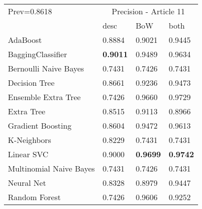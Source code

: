 \begin{tabular}{|l|l|l|l| }
\hline
Prev=0.8618 &  \multicolumn{3}{c|}{Precision - Article 11} \\
\cline{2-4} & desc & BoW & both \\ \hline
AdaBoost                & 0.8884 & 0.9021 & 0.9445\\
BaggingClassifier       & {\bf 0.9011} & 0.9489 & 0.9634\\
Bernoulli Naive Bayes   & 0.7431 & 0.7426 & 0.7431\\
Decision Tree           & 0.8661 & 0.9236 & 0.9473\\
Ensemble Extra Tree     & 0.7426 & 0.9660 & 0.9729\\
Extra Tree              & 0.8515 & 0.9113 & 0.8966\\
Gradient Boosting       & 0.8604 & 0.9472 & 0.9613\\
K-Neighbors             & 0.8229 & 0.7431 & 0.7431\\
Linear SVC              & 0.9000 & {\bf 0.9699} & {\bf 0.9742}\\
Multinomial Naive Bayes & 0.7431 & 0.7426 & 0.7431\\
Neural Net              & 0.8328 & 0.8979 & 0.9447\\
Random Forest           & 0.7426 & 0.9606 & 0.9252\\
\hline
\end{tabular}
